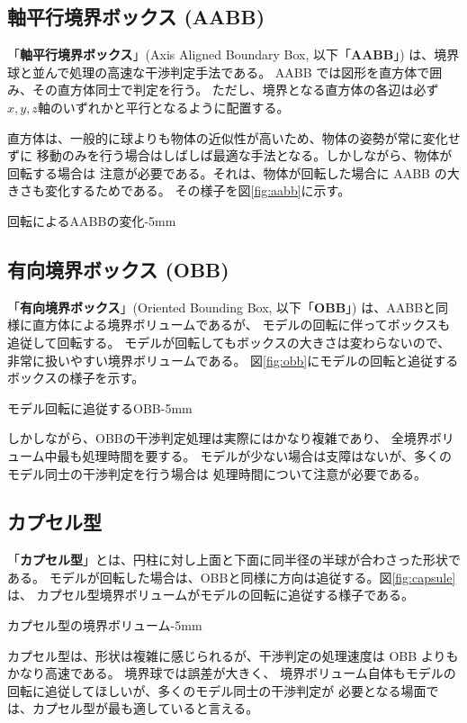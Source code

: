 \subsection{軸平行境界ボックス (AABB)}
「\textbf{軸平行境界ボックス}」(Axis Aligned Boundary Box, 以下「\textbf{AABB}」)
は、境界球と並んで処理の高速な干渉判定手法である。
AABB では図形を直方体で囲み、その直方体同士で判定を行う。
ただし、境界となる直方体の各辺は必ず \(x,y,z軸\)のいずれかと平行となるように配置する。

直方体は、一般的に球よりも物体の近似性が高いため、物体の姿勢が常に変化せずに
移動のみを行う場合はしばしば最適な手法となる。しかしながら、物体が回転する場合は
注意が必要である。それは、物体が回転した場合に AABB の大きさも変化するためである。
その様子を図\ref{fig:aabb}に示す。

	{回転によるAABBの変化}{-5mm}

\subsection{有向境界ボックス (OBB)}
「\textbf{有向境界ボックス}」(Oriented Bounding Box, 以下「\textbf{OBB}」)
は、AABBと同様に直方体による境界ボリュームであるが、
モデルの回転に伴ってボックスも追従して回転する。
モデルが回転してもボックスの大きさは変わらないので、
非常に扱いやすい境界ボリュームである。
図\ref{fig:obb}にモデルの回転と追従するボックスの様子を示す。

	{モデル回転に追従するOBB}{-5mm}

しかしながら、OBBの干渉判定処理は実際にはかなり複雑であり、
全境界ボリューム中最も処理時間を要する。
モデルが少ない場合は支障はないが、多くのモデル同士の干渉判定を行う場合は
処理時間について注意が必要である。

\subsection{カプセル型}
「\textbf{カプセル型}」とは、円柱に対し上面と下面に同半径の半球が合わさった形状である。
モデルが回転した場合は、OBBと同様に方向は追従する。図\ref{fig:capsule}は、
カプセル型境界ボリュームがモデルの回転に追従する様子である。

	{カプセル型の境界ボリューム}{-5mm}

カプセル型は、形状は複雑に感じられるが、干渉判定の処理速度は OBB よりもかなり高速である。
境界球では誤差が大きく、
境界ボリューム自体もモデルの回転に追従してほしいが、多くのモデル同士の干渉判定が
必要となる場面では、カプセル型が最も適していると言える。

